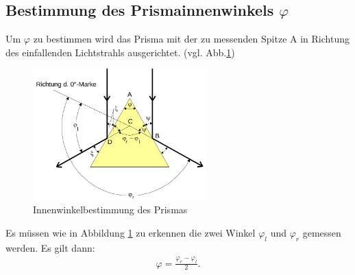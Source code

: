 \subsection{Bestimmung des Prismainnenwinkels $\varphi$}
Um $\varphi$ zu bestimmen wird das Prisma mit der zu messenden Spitze A in Richtung des einfallenden Lichtstrahls ausgerichtet. 
(vgl. Abb.\ref{pic_prismaphi})
\begin{figure}[H]
\includegraphics[width=0.6\textwidth]{pics/prisma_phi.png}
\caption{Innenwinkelbestimmung des Prismas}
\label{pic_prismaphi}
\end{figure}
Es müssen wie in Abbildung \ref{pic_prismaphi} zu erkennen die zwei Winkel $\varphi_l$ und $\varphi_r$ gemessen werden. Es gilt dann:
\begin{align}
\varphi=\frac{\varphi_r-\varphi_l}{2}.
\label{eq_phi}
\end{align}
